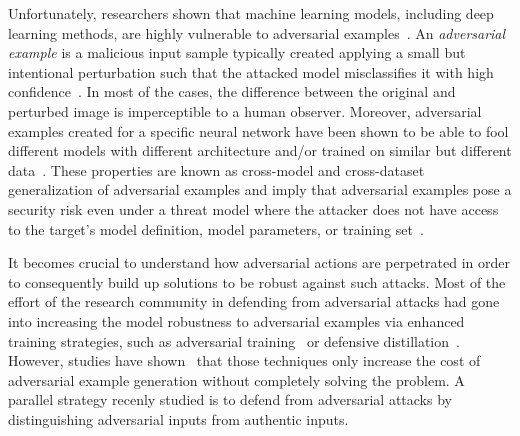 Unfortunately, researchers shown that machine learning models, including deep learning methods, are highly vulnerable to adversarial examples~\cite{klarreich2016learning,goodfellow2014explaining,szegedy2013intriguing,papernot2016practical}.
An \emph{adversarial example} is a malicious input sample typically created applying a small but intentional perturbation such that the attacked model misclassifies it with high confidence~\cite{goodfellow2014explaining}.
In most of the cases, the difference between the original and perturbed image is imperceptible to a human observer.
Moreover, adversarial examples created for a specific neural network have been shown to be able to
fool different models with different architecture and/or trained on similar but different data~\cite{szegedy2013intriguing,papernot2016practical}.
These properties are known as cross-model and cross-dataset generalization of adversarial examples and imply that adversarial examples pose a security risk even under a threat model where the attacker does not have access to the target's model definition, model parameters, or training set~\cite{papernot2016practical,kurakin2016adversarial}.

It becomes crucial to understand how adversarial actions are perpetrated in order to consequently build up solutions to be robust against such attacks.
Most of the effort of the research community in defending from adversarial attacks had gone into increasing the model robustness to adversarial examples via enhanced training strategies, such as adversarial training~\cite{goodfellow2014explaining,papernot2016limitations} or defensive distillation~\cite{papernot2016distillation,grosse2016adversarial}.
However, studies have shown~\cite{papernot2016practical} that those techniques only increase the cost of adversarial example generation without completely solving the problem.
A parallel strategy recenly studied is to defend from adversarial attacks by distinguishing adversarial inputs from authentic inputs.

